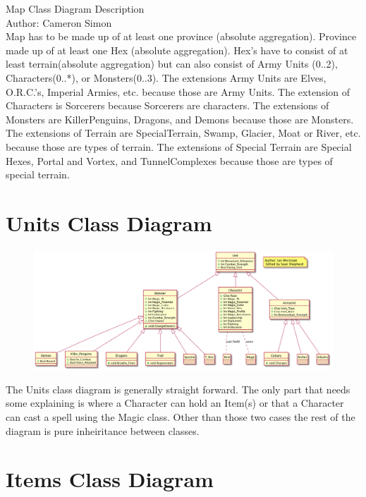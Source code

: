 \documentclass[12pt,letterpaper]{scrreprt}
\begin{document}
Map Class Diagram Description\\
Author: Cameron Simon\\

Map has to be made up of at least one province (absolute aggregation).
Province made up of at least one Hex (absolute aggregation).
Hex's have to consist of at least terrain(absolute aggregation) but can 
also consist of Army Units (0..2), Characters(0..*), or Monsters(0..3).
The extensions Army Units are Elves, O.R.C.'s, Imperial Armies, etc. because
those are Army Units.
The extension of Characters is Sorcerers because Sorcerers are characters.
The extensions of Monsters are KillerPenguins, Dragons, and Demons because
those are Monsters.
The extensions of Terrain are SpecialTerrain, Swamp, Glacier, Moat or River, 
etc. because those are types of terrain.
The extensions of Special Terrain are Special Hexes, Portal and Vortex, and 
TunnelComplexes because those are types of special terrain.





\chapter {Units Class Diagram}


\begin{figure}[ht!]
\centering
\includegraphics[width=160mm]{Units Class Diagram.png}
\label{overflow}
\end{figure}

    
The Units class diagram is generally straight forward. The only part that needs
some explaining is where a Character can hold an Item(s) or that a Character 
can cast a spell using the Magic class. Other than those two cases the rest of
the diagram is pure inheiritance between classes. 
    
    



\chapter {Items Class Diagram}
\end{document}
